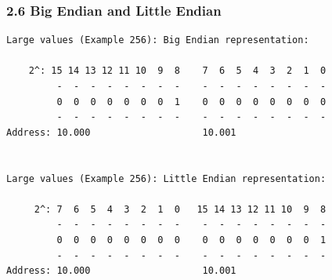 \begin{frame}[fragile]
  \frametitle{2.6 Big Endian and Little Endian}
	\begin{lstlisting}
Large values (Example 256): Big Endian representation:

    2^: 15 14 13 12 11 10  9  8    7  6  5  4  3  2  1  0
         -  -  -  -  -  -  -  -    -  -  -  -  -  -  -  - 
         0  0  0  0  0  0  0  1    0  0  0  0  0  0  0  0 
         -  -  -  -  -  -  -  -    -  -  -  -  -  -  -  - 
Address: 10.000                    10.001 
           
            
Large values (Example 256): Little Endian representation:

     2^: 7  6  5  4  3  2  1  0   15 14 13 12 11 10  9  8 
         -  -  -  -  -  -  -  -    -  -  -  -  -  -  -  - 
         0  0  0  0  0  0  0  0    0  0  0  0  0  0  0  1 
         -  -  -  -  -  -  -  -    -  -  -  -  -  -  -  - 
Address: 10.000                    10.001 
	\end{lstlisting}
\end{frame}


